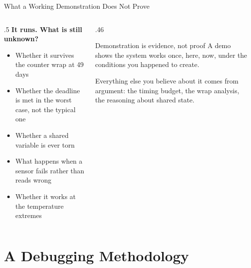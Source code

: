 \documentclass[9pt,aspectratio=169,xcolor=table]{beamer}
\begin{document}
\begin{frame}{What a Working Demonstration Does Not Prove}
    \begin{columns}[T]
    \begin{column}{.5\textwidth}
        \textbf{It runs. What is still unknown?}
        {\small
        \begin{itemize}\itemsep1pt
            \item Whether it survives the \alert{counter wrap} at 49 days
            \item Whether the deadline is met in the \alert{worst case}, not the
                  typical one
            \item Whether a shared variable is ever \alert{torn}
            \item What happens when a sensor \alert{fails} rather than reads wrong
            \item Whether it works at the \alert{temperature extremes}
        \end{itemize}}
    \end{column}
    \begin{column}{.46\textwidth}
        \begin{block}{Demonstration is evidence, not proof}
            A demo shows the system works \alert{once, here, now}, under the
            conditions you happened to create.

            \vspace{2mm}
            Everything else you believe about it comes from \alert{argument}: the
            timing budget, the wrap analysis, the reasoning about shared state.
        \end{block}
    \end{column}
    \end{columns}
\end{frame}


\section{A Debugging Methodology}
\end{document}
